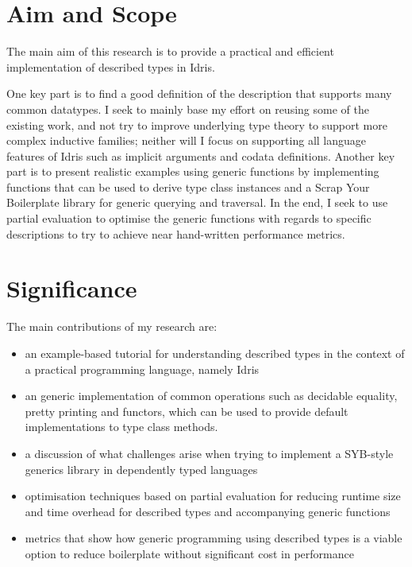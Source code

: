 \documentclass{ituthesis}
\begin{document}
\section{Aim and Scope}
\label{sec:AimandScope}
The main aim of this research is to provide a practical and efficient implementation of described types in Idris.

One key part is to find a good definition of the description that supports many common datatypes.
I seek to mainly base my effort on reusing some of the existing work, and not try to improve underlying type theory to support more complex inductive families; neither will I focus on supporting all language features of Idris such as implicit arguments and codata definitions.
Another key part is to present realistic examples using generic functions by implementing functions that can be used to derive type class instances and a Scrap Your Boilerplate library for generic querying and traversal.
In the end, I seek to use partial evaluation to optimise the generic functions with regards to specific descriptions to try to achieve near hand-written performance metrics. %

\section{Significance}
\label{sec:Significance}
The main contributions of my research are:

\begin{itemize}
  \item an example-based tutorial for understanding described types in the context of a practical programming language, namely Idris
  \item an generic implementation of common operations such as decidable equality, pretty printing and functors, which can be used to provide default implementations to type class methods.
  \item a discussion of what challenges arise when trying to implement a SYB-style generics library in dependently typed languages
  \item optimisation techniques based on partial evaluation for reducing runtime size and time overhead for described types and accompanying generic functions
  \item metrics that show how generic programming using described types is a viable option to reduce boilerplate without significant cost in performance
\end{itemize}
\end{document}

